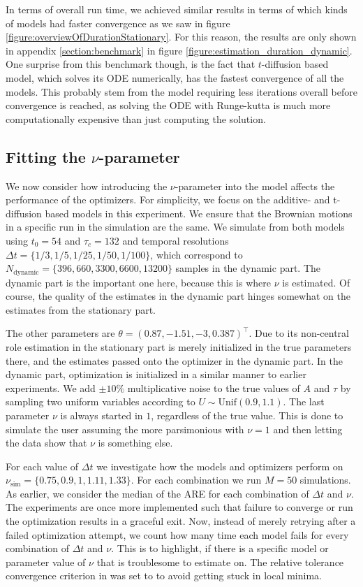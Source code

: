 In terms of overall run time, we achieved similar results in terms of which kinds of models had faster convergence as we saw in figure \ref{figure:overviewOfDurationStationary}. For this reason, the results are only shown in appendix \ref{section:benchmark} in figure \ref{figure:estimation_duration_dynamic}. One surprise from this benchmark though, is the fact that $t$-diffusion based model, which solves its ODE numerically, has the fastest convergence of all the models. This probably stem from the model requiring less iterations overall before convergence is reached, as solving the ODE with Runge-kutta is much more computationally expensive than just computing the solution.
\subsection{Fitting the \texorpdfstring{$\nu$}{nu}-parameter}
We now consider how introducing the $\nu$-parameter into the model affects the performance of the optimizers. For simplicity, we focus on the additive- and t-diffusion based models in this experiment. We ensure that the Brownian motions in a specific run in the simulation are the same. We simulate from both models using $t_0 = 54$ and $\tau_c = 132$ and temporal resolutions $\Delta t = \{1/3, 1/5, 1/25, 1/50, 1/100\}$, which correspond to $N_\mathrm{dynamic} = \{396, 660, 3300, 6600, 13200\}$ samples in the dynamic part. The dynamic part is the important one here, because this is where $\nu$ is estimated. Of course, the quality of the estimates in the dynamic part hinges somewhat on the estimates from the stationary part.

The other parameters are $\theta = (0.87, -1.51, -3,  0.387)^\top$. Due to its non-central role estimation in the stationary part is merely initialized in the true parameters there, and the estimates passed onto the optimizer in the dynamic part. In the dynamic part, optimization is initialized in a similar manner to earlier experiments. We add $\pm 10\%$ multiplicative noise to the true values of $A$ and $\tau$ by sampling two uniform variables according to $U\sim \mathrm{Unif}(0.9,1.1)$. The last parameter $\nu$ is always started in $1$, regardless of the true value. This is done to simulate the user assuming the more parsimonious with $\nu = 1$ and then letting the data show that $\nu$ is something else. 

For each value of $\Delta t$ we investigate how the models and optimizers perform on $\nu_{\mathrm{sim}} = \{0.75, 0.9, 1, 1.11, 1.33\}$. For each combination we run $M = 50$ simulations. As earlier, we consider the median of the ARE for each combination of $\Delta t$ and $\nu$. The experiments are once more implemented such that failure to converge or run the optimization results in a graceful exit. Now, instead of merely retrying after a failed optimization attempt, we count how many time each model fails for every combination of $\Delta t$ and $\nu$. This is to highlight, if there is a specific model or parameter value of $\nu$ that is troublesome to estimate on. The relative tolerance convergence criterion in  was set to  to avoid getting stuck in local minima. 

